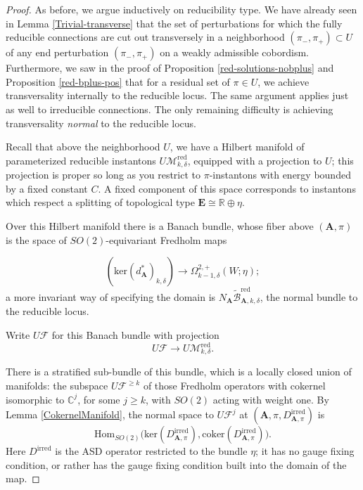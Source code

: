 \documentclass[10pt,a4paper]{amsart}
\theoremstyle{definition}
\theoremstyle{remark}
\numberwithin{figure}{qchap}
\begin{document}
\begin{proof}As before, we argue inductively on reducibility type. We have already seen in Lemma \ref{Trivial-transverse} that the set of perturbations for which the fully reducible connections are cut out transversely in a neighborhood $(\pi_-,\pi_+) \subset U$ of any end perturbation $(\pi_-, \pi_+)$ on a weakly admissible cobordism. Furthermore, we saw in the proof of Proposition \ref{red-solutions-nobplus} and Proposition \ref{red-bplus-pos} that for a residual set of $\pi \in U$, we achieve transversality internally to the reducible locus. The same argument applies just as well to irreducible connections. The only remaining difficulty is achieving transversality \emph{normal} to the reducible locus.

Recall that above the neighborhood $U$, we have a Hilbert manifold of parameterized reducible instantons $U\mathcal M^{\text{red}}_{k,\delta}$, equipped with a projection to $U$; this projection is proper so long as you restrict to $\pi$-instantons with energy bounded by a fixed constant $C$. A fixed component of this space corresponds to instantons which respect a splitting of topological type $\mathbf{E} \cong \mathbb R \oplus \eta$.

Over this Hilbert manifold there is a Banach bundle, whose fiber above $(\mathbf{A},\pi)$ is the space of $SO(2)$-equivariant Fredholm maps

$$\left(\text{ker}(d_{\mathbf{A}}^*)_{k,\delta}\right) \to \Omega^{2,+}_{k-1,\delta}(W;\eta);$$
a more invariant way of specifying the domain is $N_{\mathbf{A}} \widetilde{\mathcal B}^{\text{red}}_{\mathbf{A},k,\delta}$, the normal bundle to the reducible locus.

Write $U\mathcal F$ for this Banach bundle with projection $$U \mathcal F \to U \mathcal M^{\text{red}}_{k,\delta}.$$

There is a stratified sub-bundle of this bundle, which is a locally closed union of manifolds: the subspace $U \mathcal F^{\geq k}$ of those Fredholm operators with cokernel isomorphic to $\mathbb C^j$, for some $j \geq k$, with $SO(2)$ acting with weight one. By Lemma \ref{CokernelManifold}, the normal space to $U \mathcal F^j$ at $(\mathbf{A},\pi, D^{\text{irred}}_{\mathbf{A},\pi})$ is
$$\text{Hom}_{SO(2)}\big(\text{ker}(D^{\text{irred}}_{\mathbf{A},\pi}), \text{coker}(D^{\text{irred}}_{\mathbf{A},\pi})\big).$$
Here $D^{\text{irred}}$ is the ASD operator restricted to the bundle $\eta$; it has no gauge fixing condition, or rather has the gauge fixing condition built into the domain of the map.


\end{proof}
\end{document}
